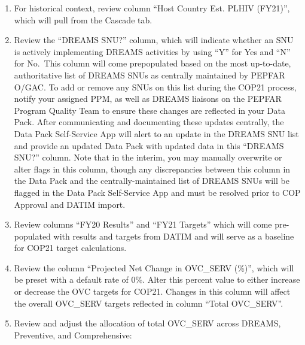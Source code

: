 \documentclass[
  openany]{book}
\begin{document}
\begin{enumerate}
\def\labelenumi{\arabic{enumi}.}
\item
  For historical context, review column ``Host Country Est. PLHIV
  (FY21)'', which will pull from the Cascade tab.
\item
  Review the ``DREAMS SNU?'' column, which will indicate whether an SNU
  is actively implementing DREAMS activities by using ``Y'' for Yes and
  ``N'' for No.~This column will come prepopulated based on the most
  up-to-date, authoritative list of DREAMS SNUs as centrally
  maintained by PEPFAR O/GAC. To add or remove any SNUs on this list
  during the COP21 process, notify your assigned PPM, as well as
  DREAMS liaisons on the PEPFAR Program Quality Team to ensure these
  changes are reflected in your Data Pack. After communicating and
  documenting these updates centrally, the Data Pack Self-Service App
  will alert to an update in the DREAMS SNU list and provide an
  updated Data Pack with updated data in this ``DREAMS SNU?'' column.
  Note that in the interim, you may manually overwrite or alter flags
  in this column, though any discrepancies between this column in the
  Data Pack and the centrally-maintained list of DREAMS SNUs will be
  flagged in the Data Pack Self-Service App and must be resolved prior
  to COP Approval and DATIM import.
\item
  Review columns ``FY20 Results'' and ``FY21 Targets'' which will come
  pre-populated with results and targets from DATIM and will serve as
  a baseline for COP21 target calculations.
\item
  Review the column ``Projected Net Change in OVC\_SERV (\%)'', which will
  be preset with a default rate of 0\%. Alter this percent value to
  either increase or decrease the OVC targets for COP21. Changes in
  this column will affect the overall OVC\_SERV targets reflected in
  column ``Total OVC\_SERV''.
\item
  Review and adjust the allocation of total OVC\_SERV across DREAMS,
  Preventive, and Comprehensive:


\end{enumerate}
\end{document}
